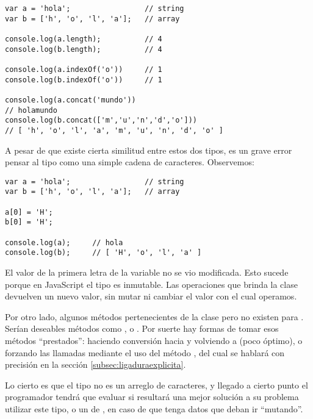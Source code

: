 \begin{lstlisting}[title={Similitudes entre \code{string} y un \code{array}}]
var a = 'hola';                 // string
var b = ['h', 'o', 'l', 'a'];   // array

console.log(a.length);          // 4
console.log(b.length);          // 4

console.log(a.indexOf('o'))     // 1
console.log(b.indexOf('o'))     // 1

console.log(a.concat('mundo'))  
// holamundo
console.log(b.concat(['m','u','n','d','o']))
// ​​​​​[ 'h', 'o', 'l', 'a', 'm', 'u', 'n', 'd', 'o' ]​​​​​
\end{lstlisting}

A pesar de que existe cierta similitud entre estos dos tipos, es un grave error pensar al tipo  como una simple cadena de caracteres. Observemos:

\begin{lstlisting}
var a = 'hola';                 // string
var b = ['h', 'o', 'l', 'a'];   // array

a[0] = 'H';
b[0] = 'H';

console.log(a);		// hola
console.log(b);		// ​​​​​[ 'H', 'o', 'l', 'a' ]​​​​​
\end{lstlisting}

El valor de la primera letra de la variable  no se vio modificada. Esto sucede porque en JavaScript el tipo  es inmutable. Las operaciones que brinda la clase  devuelven un nuevo valor, sin mutar ni cambiar el valor con el cual operamos.

Por otro lado, algunos métodos pertenecientes de la clase  pero no existen para . Serían deseables métodos como ,  o . Por suerte hay formas de tomar esos métodos "`prestados"': haciendo conversión hacia  y volviendo a  (poco óptimo), o forzando las llamadas mediante el uso del método , del cual se hablará con precisión en la sección \ref{subsec:ligaduraexplicita}.

Lo cierto es que el tipo  no es un arreglo de caracteres, y llegado a cierto punto el programador tendrá que evaluar si resultará una mejor solución a su problema utilizar este tipo, o un  de , en caso de que tenga datos que deban ir "`mutando"'.

\subsection{}


